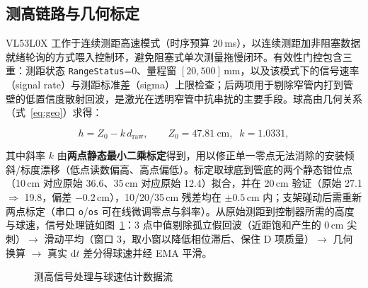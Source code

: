 \documentclass[12pt,a4paper]{ctexart}
\begin{document}
\subsection{测高链路与几何标定}

VL53L0X 工作于连续测距高速模式（时序预算 20\,ms），以连续测距加非阻塞数据就绪轮询的方式喂入控制环，避免阻塞式单次测量拖慢闭环。有效性门控包含三重：测距状态 \texttt{RangeStatus}=0、量程窗 $[20,500]$\,mm，以及该模式下的信号速率（signal rate）与测距标准差（sigma）上限检查；后两项用于剔除窄管内打到管壁的低置信度散射回波，是激光在透明窄管中抗串扰的主要手段。球高由几何关系（式~\eqref{eq:geo}）求得：

\begin{equation}
h=Z_0-k\,d_{\mathrm{raw}} ,\qquad Z_0=47.81~\mathrm{cm},\;\; k=1.0331 ,
\label{eq:geo}
\end{equation}

其中斜率 $k$ 由\textbf{两点静态最小二乘标定}得到，用以修正单一零点无法消除的安装倾斜/标度漂移（低点读数偏高、高点偏低）。标定取球底到管底的两个静态钳位点（10\,cm 对应原始 36.6、35\,cm 对应原始 12.4）拟合，并在 20\,cm 验证（原始 27.1 $\Rightarrow$ 19.8，偏差 $-0.2$\,cm），10/20/35\,cm 残差均在 $\pm0.5$\,cm 内；支架碰动后需重新两点标定（串口 \texttt{o}/\texttt{os} 可在线微调零点与斜率）。从原始测距到控制器所需的高度与球速，信号处理链如图~\ref{fig:filter}：3 点中值剔除孤立假回波（近距饱和产生的 0\,cm 尖刺）$\rightarrow$ 滑动平均（窗口 3，取小窗以降低相位滞后、保住 D 项质量）$\rightarrow$ 几何换算 $\rightarrow$ 真实 $\mathrm{d}t$ 差分得球速并经 EMA 平滑。

\begin{figure}[H]
\centering
{}
\caption{测高信号处理与球速估计数据流}
\label{fig:filter}
\end{figure}
\end{document}
